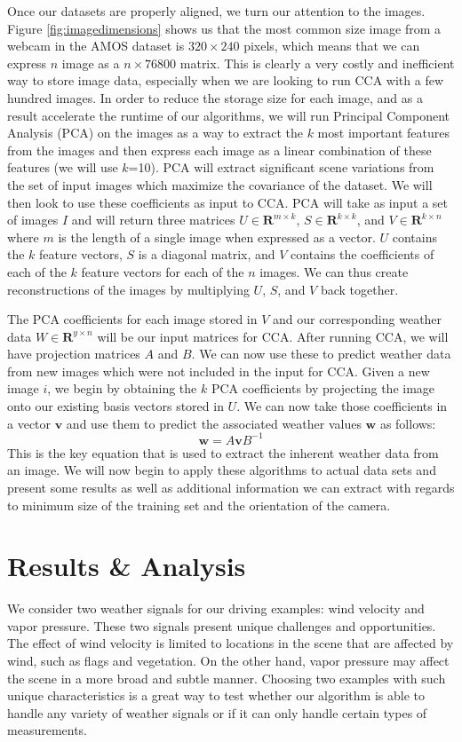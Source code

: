 Once our datasets are properly aligned, we turn our attention to the images. Figure \ref{fig:imagedimensions} shows us that the most common size image from a webcam in the AMOS dataset is $320\times 240$ pixels, which means that we can express $n$ image as a $n\times 76800$ matrix. This is clearly a very costly and inefficient way to store image data, especially when we are looking to run CCA with a few hundred images. In order to reduce the storage size for each image, and as a result accelerate the runtime of our algorithms, we will run Principal Component Analysis (PCA) on the images as a way to extract the $k$ most important features from the images and then express each image as a linear combination of these features (we will use $k$=10). PCA will extract significant scene variations from the set of input images which maximize the covariance of the dataset. We will then look to use these coefficients as input to CCA. PCA will take as input a set of images $I$ and will return three matrices $U\in \mathbf{R}^{m\times k}$, $S\in \mathbf{R}^{k\times k}$, and $V\in \mathbf{R}^{k\times n}$ where $m$ is the length of a single image when expressed as a vector. $U$ contains the $k$ feature vectors, $S$ is a diagonal matrix, and $V$ contains the coefficients of each of the $k$ feature vectors for each of the $n$ images. We can thus create reconstructions of the images by multiplying $U$, $S$, and $V$ back together.

The PCA coefficients for each image stored in $V$ and our corresponding weather data $W \in \mathbf{R}^{y\times n}$ will be our input matrices for CCA. After running CCA, we will have projection matrices $A$ and $B$. We can now use these to predict weather data from new images which were not included in the input for CCA. Given a new image $i$, we begin by obtaining the $k$ PCA coefficients by projecting the image onto our existing basis vectors stored in $U$. We can now take those coefficients in a vector $\mathbf{v}$ and use them to predict the associated weather values $\mathbf{w}$ as follows:
\begin{equation}\mathbf{w}=A\mathbf{v}B^{-1}\end{equation}
This is the key equation that is used to extract the inherent weather data from an image. We will now begin to apply these algorithms to actual data sets and present some results as well as additional information we can extract with regards to minimum size of the training set and the orientation of the camera.

\chapter{Results \& Analysis}
\label{cpt:results}
We consider two weather signals for our driving examples: wind velocity and vapor pressure. These two signals present unique challenges and opportunities. The effect of wind velocity is limited to locations in the scene that are affected by wind, such as flags and vegetation. On the other hand, vapor pressure may affect the scene in a more broad and subtle manner. Choosing two examples with such unique characteristics is a great way to test whether our algorithm is able to handle any variety of weather signals or if it can only handle certain types of measurements.


